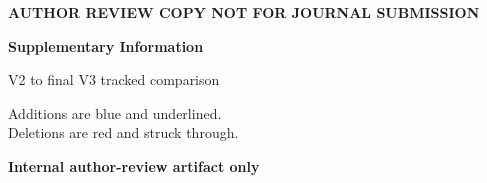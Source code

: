 \documentclass[11pt]{article}
\begin{document}
\begin{center}
\vspace*{1.65in}
{\color{red}\bfseries\Large AUTHOR REVIEW COPY NOT FOR JOURNAL SUBMISSION\par}
\vspace{0.8in}
{\Huge\bfseries Supplementary Information\par}
\vspace{0.2in}
{\LARGE V2 to final V3 tracked comparison\par}
\vspace{0.75in}
{\large Additions are blue and underlined.\\
Deletions are red and struck through.\par}
\vfill
{\color{red}\bfseries Internal author-review artifact only\par}
\end{center}
\end{document}

